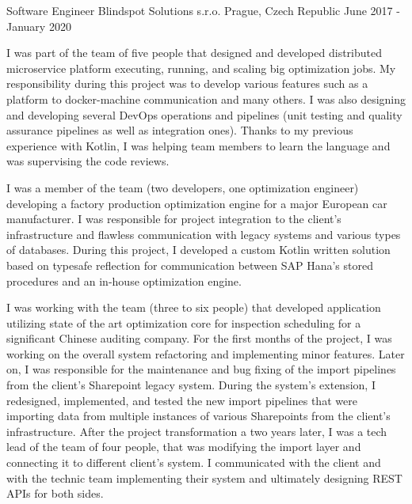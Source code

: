 \begin{cventries}
	\cventry
	{Software Engineer}
	{Blindspot Solutions s.r.o.}
	{Prague, Czech Republic}
	{June 2017 - January 2020}
	{
		\begin{cvitems}
			\setlength\itemsep{8pt}
			\item {
				I was part of the team of five people that designed and developed distributed microservice platform executing, running,
				and scaling big optimization jobs. 
			 	\newline
			 	My responsibility during this project was to develop various features such as a platform to docker-machine communication and many others.
				I was also designing and developing several DevOps operations and pipelines 
				(unit testing and quality assurance pipelines as well as integration ones).
				Thanks to my previous experience with Kotlin, I was helping team members to learn the language and was supervising the code reviews.
			}
			\item {
				I was a member of the team (two developers, one optimization engineer) developing a factory production optimization engine
				for a major European car manufacturer. 
				\newline
				I was responsible for project integration to the client's infrastructure and flawless communication with legacy systems 
				and various types of databases.
				During this project, I developed a custom Kotlin written solution based on typesafe reflection for communication
				between SAP Hana's stored procedures and an in-house optimization engine.
			}
			\item {
				I was working with the team (three to six people) that developed application utilizing state of the art optimization core 
				for inspection scheduling for a significant Chinese auditing company. 
				\newline
				For the first months of the project, I was working on the overall system refactoring and implementing minor features.
				Later on, I was responsible for the maintenance and bug fixing of the import pipelines from the client's Sharepoint legacy system.
				During the system's extension, I redesigned, implemented, and tested the new import pipelines that were importing data 
				from multiple instances of various Sharepoints from the client's infrastructure.
				\newline
				After the project transformation a two years later, I was a tech lead of the team of four people, 
				that was modifying the import layer and connecting it to different client's system. 
				I communicated with the client and with the technic team implementing their system and ultimately designing REST APIs for both sides.
			}
		\end{cvitems}
	}
	

\end{cventries}
